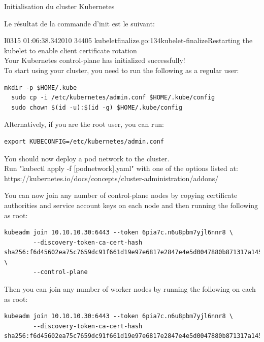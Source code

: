 \begin{frame}[shrink=7,fragile]{Initialisation du cluster Kubernetes}

Le résultat de la commande d'init est le suivant:

\begin{tcolorbox}
I0315 01:06:38.342010   34405 kubeletfinalize.go:134\rbrack \lbrack kubelet-finalize\rbrack Restarting the kubelet to enable client certificate rotation\\
Your Kubernetes control-plane has initialized successfully!\\
To start using your cluster, you need to run the following as a regular user:

\begin{tiny}
\begin{Verbatim}[commandchars=\&\@\@]
  mkdir -p $HOME/.kube
  sudo cp -i /etc/kubernetes/admin.conf $HOME/.kube/config
  sudo chown $(id -u):$(id -g) $HOME/.kube/config
\end{Verbatim}
\end{tiny}

Alternatively, if you are the root user, you can run:\\

\begin{tiny}
\begin{Verbatim}[commandchars=\&\@\@]
  export KUBECONFIG=/etc/kubernetes/admin.conf
\end{Verbatim}
\end{tiny}

You should now deploy a pod network to the cluster.\\
Run "kubectl apply -f [podnetwork].yaml" with one of the options listed at:\\
  https://kubernetes.io/docs/concepts/cluster-administration/addons/

You can now join any number of control-plane nodes by copying certificate authorities
and service account keys on each node and then running the following as root:

\begin{tiny}
\begin{Verbatim}[commandchars=\&\@\@]
  kubeadm join 10.10.10.30:6443 --token 6pia7c.n6u8pbm7yjl6nnr8 \
        --discovery-token-ca-cert-hash sha256:f6d45602ea75c7659dc91f661d19e97e6817e2847e4e5d0047880b871317a145 \
        --control-plane 
\end{Verbatim}
\end{tiny}

Then you can join any number of worker nodes by running the following on each as root:

\begin{tiny}
\begin{Verbatim}[commandchars=\&\@\@]
kubeadm join 10.10.10.30:6443 --token 6pia7c.n6u8pbm7yjl6nnr8 \
        --discovery-token-ca-cert-hash sha256:f6d45602ea75c7659dc91f661d19e97e6817e2847e4e5d0047880b871317a145 
\end{Verbatim}
\end{tiny}
\end{tcolorbox}

\end{frame}

